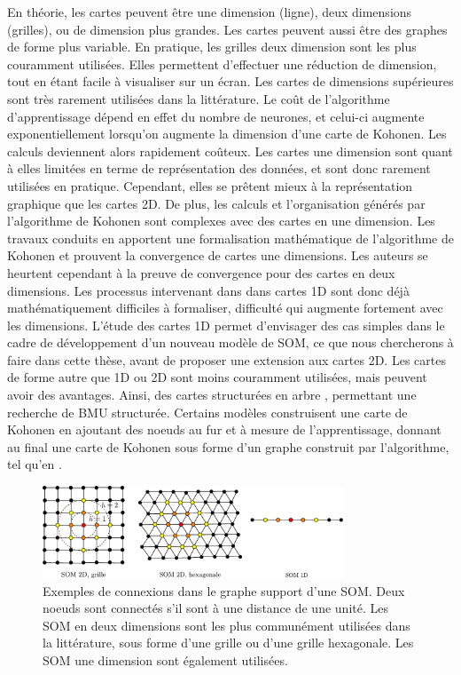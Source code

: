 \documentclass[../main]{subfiles}
\begin{document}
En théorie, les cartes peuvent être une dimension (ligne), deux dimensions (grilles), ou de dimension plus grandes. Les cartes peuvent aussi être des graphes de forme plus variable. En pratique, les grilles deux dimension sont les plus couramment utilisées. Elles permettent d'effectuer une réduction de dimension, tout en étant facile à visualiser sur un écran. Les cartes de dimensions supérieures sont très rarement utilisées dans la littérature. Le coût de l'algorithme d'apprentissage dépend en effet du nombre de neurones, et celui-ci augmente exponentiellement lorsqu'on augmente la dimension d'une carte de Kohonen. Les calculs deviennent alors rapidement coûteux.
Les cartes une dimension sont quant à elles limitées en terme de représentation des données, et sont donc rarement utilisées en pratique. Cependant, elles se prêtent mieux à la représentation graphique que les cartes 2D.
De plus, les calculs et l'organisation générés par l'algorithme de Kohonen sont complexes avec des cartes en une dimension. Les travaux conduits en \cite{cottrell_theoretical_2016,fort_soms_2006} apportent une formalisation mathématique de l'algorithme de Kohonen et prouvent la convergence de cartes une dimensions. Les auteurs se heurtent cependant à la preuve de convergence pour des cartes en deux dimensions.
Les processus intervenant dans dans cartes 1D sont donc déjà mathématiquement difficiles à formaliser, difficulté qui augmente fortement avec les dimensions.
L'étude des cartes 1D permet d'envisager des cas simples dans le cadre de développement d'un nouveau modèle de SOM, ce que nous chercherons à faire dans cette thèse, avant de proposer une extension aux cartes 2D.
Les cartes de forme autre que 1D ou 2D sont moins couramment utilisées, mais peuvent avoir des avantages. Ainsi, des cartes structurées en arbre \cite{koikkalainen_self-organizing_1990}, permettant une recherche de BMU structurée. Certains modèles construisent une carte de Kohonen en ajoutant des noeuds au fur et à mesure de l'apprentissage, donnant au final une carte de Kohonen sous forme d'un graphe construit par l'algorithme, tel qu'en \cite{alahakoon_dynamic_2000}.

\begin{figure}
\centering
\includegraphics[width=0.8\textwidth]{soms_topologies}
\caption{Exemples de connexions dans le graphe support d'une SOM. Deux noeuds sont connectés s'il sont à une distance de une unité. Les SOM en deux dimensions sont les plus communément utilisées dans la littérature, sous forme d'une grille ou d'une grille hexagonale. Les SOM une dimension sont également utilisées.}
\label{fig:topo}
\end{figure}
\end{document}
